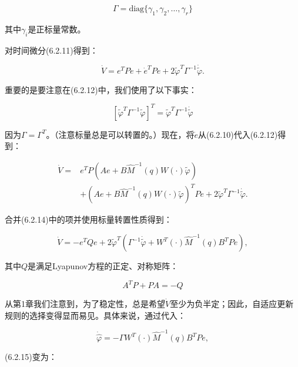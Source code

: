 \documentclass[12pt,a4paper]{ctexart}
\begin{document}
\begin{equation}
\Gamma = \text{diag}\{\gamma_1, \gamma_2, \ldots, \gamma_r\}
\end{equation}

其中$\gamma_i$是正标量常数。

对时间微分(6.2.11)得到：

\begin{equation}\label{eq:6.2.12}
\dot{V} = e^T P \dot{e} + \dot{e}^T P e + 2\tilde{\varphi}^T \Gamma^{-1} \dot{\tilde{\varphi}}.
\end{equation}

重要的是要注意在(6.2.12)中，我们使用了以下事实：

\begin{equation}\label{eq:6.2.13}
\left[\tilde{\varphi}^T \Gamma^{-1} \tilde{\varphi}\right]^T = \tilde{\varphi}^T \Gamma^{-1} \dot{\tilde{\varphi}}
\end{equation}

因为$\Gamma = \Gamma^T$。（注意标量总是可以转置的。）现在，将$\dot{e}$从(6.2.10)代入(6.2.12)得到：

\begin{align}\label{eq:6.2.14}
\dot{V} = & e^T P \left( Ae + B\hat{M}^{-1}(q)W(\cdot)\tilde{\varphi} \right) \nonumber \\
& + \left( Ae + B\hat{M}^{-1}(q)W(\cdot)\tilde{\varphi} \right)^T P e + 2\tilde{\varphi}^T \Gamma^{-1} \dot{\tilde{\varphi}}.
\end{align}

合并(6.2.14)中的项并使用标量转置性质得到：

\begin{equation}\label{eq:6.2.15}
\dot{V} = -e^T Q e + 2\tilde{\varphi}^T \left( \Gamma^{-1} \dot{\tilde{\varphi}} + W^T(\cdot)\hat{M}^{-1}(q)B^T P e \right),
\end{equation}

其中$Q$是满足Lyapunov方程的正定、对称矩阵：

\begin{equation}\label{eq:6.2.q}
A^T P + PA = -Q
\end{equation}

从第1章我们注意到，为了稳定性，总是希望$\dot{V}$至少为负半定；因此，自适应更新规则的选择变得显而易见。具体来说，通过代入：

\begin{equation}\label{eq:6.2.17}
\dot{\hat{\varphi}} = -\Gamma W^T(\cdot)\hat{M}^{-1}(q)B^T P e,
\end{equation}

(6.2.15)变为：
\end{document}
